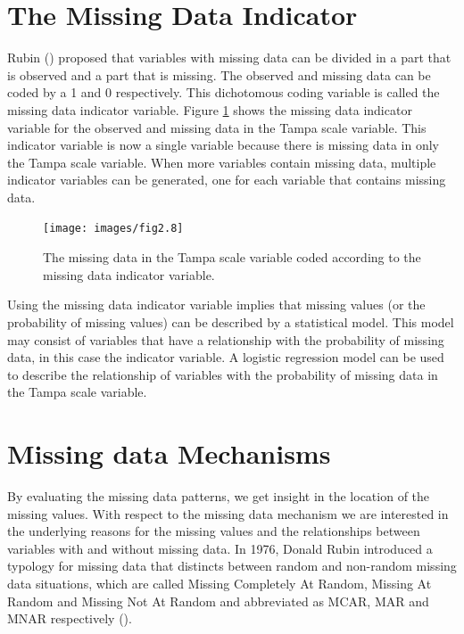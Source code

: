 \documentclass[
]{book}
\begin{document}
\hypertarget{the-missing-data-indicator}{%
\section{The Missing Data Indicator}\label{the-missing-data-indicator}}

Rubin (\citet{Rubin1987}) proposed that variables with missing data can be divided in a part that is observed and a part that is missing. The observed and missing data can be coded by a 1 and 0 respectively. This dichotomous coding variable is called the missing data indicator variable. Figure \ref{fig:fig2-8} shows the missing data indicator variable for the observed and missing data in the Tampa scale variable. This indicator variable is now a single variable because there is missing data in only the Tampa scale variable. When more variables contain missing data, multiple indicator variables can be generated, one for each variable that contains missing data.

\begin{figure}

{\centering \texttt{[image: images/fig2.8]} 

}

\caption{The missing data in the Tampa scale variable coded according to the missing data indicator variable.}\label{fig:fig2-8}
\end{figure}

Using the missing data indicator variable implies that missing values (or the probability of missing values) can be described by a statistical model. This model may consist of variables that have a relationship with the probability of missing data, in this case the indicator variable. A logistic regression model can be used to describe the relationship of variables with the probability of missing data in the Tampa scale variable.

\hypertarget{missing-data-mechanisms}{%
\section{Missing data Mechanisms}\label{missing-data-mechanisms}}

By evaluating the missing data patterns, we get insight in the location of the missing values. With respect to the missing data mechanism we are interested in the underlying reasons for the missing values and the relationships between variables with and without missing data. In 1976, Donald Rubin introduced a typology for missing data that distincts between random and non-random missing data situations, which are called Missing Completely At Random, Missing At Random and Missing Not At Random and abbreviated as MCAR, MAR and MNAR respectively (\citet{Rubin1976}).
\end{document}

